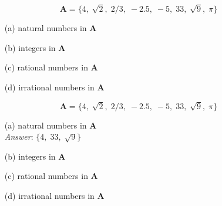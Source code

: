 \documentclass[11pt,a4paper,titlepage,oneside,openany]{article}
\numberwithin{equation}{section}
\numberwithin{algorithm}{section}
\numberwithin{figure}{section}
\numberwithin{table}{section}
\begin{document}
{%
\[\boldsymbol{A} = \{4,\; \sqrt{2},\; 2/3,\; -2.5,\; -5,\; 33,\; \sqrt{9},\; \pi \}\]
\begin{itemize}
\item[(a)] natural numbers in \textbf{A}\\
\item[(b)] integers in \textbf{A}\\
\item[(c)] rational numbers in \textbf{A}\\
\item[(d)] irrational numbers in \textbf{A}\\
\end{itemize}




\[\boldsymbol{A} = \{4,\; \sqrt{2},\; 2/3,\; -2.5,\; -5,\; 33,\; \sqrt{9},\; \pi \}\]
\begin{itemize}
\item[(a)] natural numbers in \textbf{A}\\
\hspace{1cm} \textit{Answer}: $\{4,\; 33,\; \sqrt{9}\}$
\item[(b)] integers in \textbf{A}\\
\item[(c)] rational numbers in \textbf{A}\\
\item[(d)] irrational numbers in \textbf{A}\\
\end{itemize}




}
\end{document}
